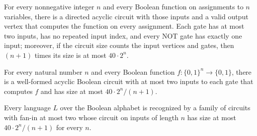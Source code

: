 \begin{theorem}
\label{BoolCircuit.exists_dagCircuit_faninTwo_mul_size_le}
\leanok
{}
For every nonnegative integer $n$ and every Boolean function on assignments to $n$
variables, there is a directed acyclic circuit with those inputs and a valid output
vertex that computes the function on every assignment. Each gate has at most two inputs,
has no repeated input index, and every NOT gate has exactly one input; moreover, if the
circuit size counts the input vertices and gates, then $(n+1)$ times its size is at most
$40\cdot 2^n$.
\end{theorem}

\begin{theorem}
\label{BoolCircuit.exists_dagCircuit_faninTwo_size_le_div}
\leanok
{}
For every natural number $n$ and every Boolean function $f\colon\{0,1\}^n\to\{0,1\}$,
there is a well-formed acyclic Boolean circuit with at most two inputs to each gate that
computes $f$ and has size at most $40\cdot 2^n/(n+1)$.
\end{theorem}

\begin{theorem}
\label{Language.inSIZE_forty_two_pow_div}
\leanok
{}
Every language $L$ over the Boolean alphabet is recognized by a family of circuits with
fan-in at most two whose circuit on inputs of length $n$ has size at most $40\cdot
2^n/(n+1)$ for every $n$.
\end{theorem}
